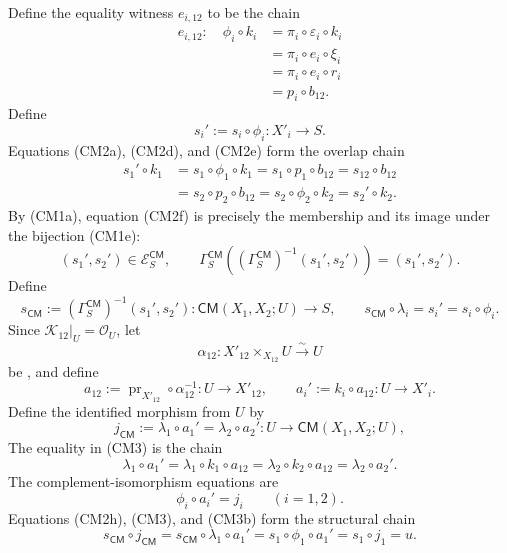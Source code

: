 \begin{definition}
\[  \]
  Define the equality witness \(e_{i,12}\) to be the chain
  \[
  \begin{aligned}
    e_{i,12}\colon\quad
    \phi_i\circ k_i
      &=\pi_i\circ\varepsilon_i\circ k_i\\
      &=\pi_i\circ e_i\circ\xi_i\\
      &=\pi_i\circ e_i\circ r_i\\
      &=p_i\circ b_{12}.
  \end{aligned}                                                     \tag{CM2d}
  \]
  Define
  \[
    s_i':=s_i\circ\phi_i\colon X'_i\to S.                          \tag{CM2e}
  \]
  Equations (CM2a), (CM2d), and (CM2e) form the overlap chain
  \[
  \begin{aligned}
    s_1'\circ k_1
      &=s_1\circ\phi_1\circ k_1
       =s_1\circ p_1\circ b_{12}
       =s_{12}\circ b_{12}\\
      &=s_2\circ p_2\circ b_{12}
       =s_2\circ\phi_2\circ k_2
       =s_2'\circ k_2.
  \end{aligned}                                                     \tag{CM2f}
  \]
  By (CM1a), equation (CM2f) is precisely the membership and its image under
  the bijection (CM1e):
  \[
    (s_1',s_2')\in\mathscr E_S^{\mathsf{CM}},\qquad
    \Gamma_S^{\mathsf{CM}}\!\left(
      (\Gamma_S^{\mathsf{CM}})^{-1}(s_1',s_2')\right)
      =(s_1',s_2').                                                \tag{CM2g}
  \]
  Define
  \[
    s_{\mathsf{CM}}:=(\Gamma_S^{\mathsf{CM}})^{-1}(s_1',s_2')
      \colon\mathsf{CM}(X_1,X_2;U)\to S,\qquad
    s_{\mathsf{CM}}\circ\lambda_i=s_i'=s_i\circ\phi_i.             \tag{CM2h}
  \]
  Since $\mathcal K_{12}|_U=\mathcal O_U$, let
  \[
    \alpha_{12}\colon X'_{12}\times_{X_{12}}U\xrightarrow{\sim}U
  \]
  be , and define
  \[
    a_{12}:=\operatorname{pr}_{X'_{12}}\circ\alpha_{12}^{-1}
      \colon U\to X'_{12},
    \qquad
    a_i':=k_i\circ a_{12}\colon U\to X'_i.                        \tag{CM2}
  \]
  Define the identified morphism from $U$ by
  \[
    j_{\mathsf{CM}}:=\lambda_1\circ a_1'
      =\lambda_2\circ a_2'\colon U\longrightarrow
        \mathsf{CM}(X_1,X_2;U),                                   \tag{CM3}
  \]
  The equality in (CM3) is the chain
  \[
    \lambda_1\circ a_1'
      =\lambda_1\circ k_1\circ a_{12}
      =\lambda_2\circ k_2\circ a_{12}
      =\lambda_2\circ a_2'.                                      \tag{CM3a}
  \]
  The complement-isomorphism equations are
  \[
    \phi_i\circ a_i'=j_i\qquad(i=1,2).                            \tag{CM3b}
  \]
  Equations (CM2h), (CM3), and (CM3b) form the structural chain
  \[
    s_{\mathsf{CM}}\circ j_{\mathsf{CM}}
      =s_{\mathsf{CM}}\circ\lambda_1\circ a_1'
      =s_1\circ\phi_1\circ a_1'
      =s_1\circ j_1=u.                                            \tag{CM3c}
  \]
\end{definition}

